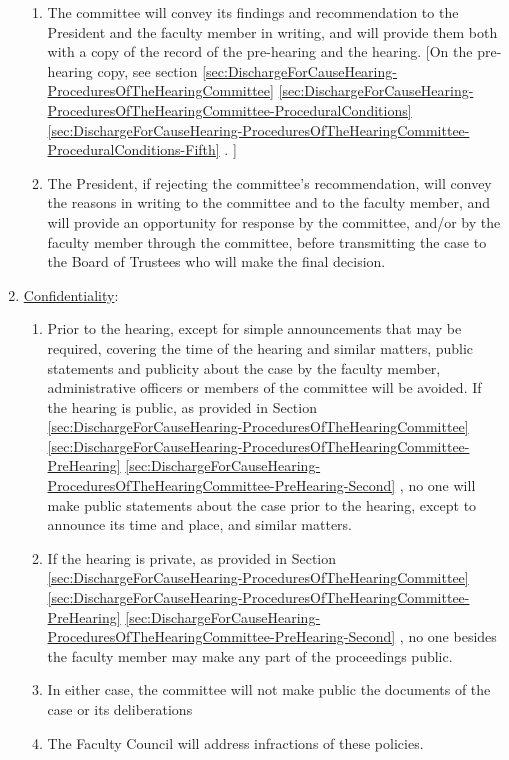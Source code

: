 \begin{enumerate}[label=\alph*)]
{\begin{enumerate}[label=\arabic*)]
{									\ref{sec:NonPerformanceOfContract}
									\ref{par:NonPerformanceOfContract-Sanctions}
									).  If the committee concludes that adequate cause for dismissal has not been established, it will recommend retention of the faculty member either with no penalties or with an academic penalty less than dismissal.}
								\item{
									\label{sec:DischargeForCauseHearing-ProceduresOfTheHearingCommittee-Hearing-Eighth}
									The committee will convey its findings and recommendation to the President and the faculty member in writing, and will provide them both with a copy of the record of the pre-hearing and the hearing.  [On the pre-hearing copy,
											see section
											\ref{sec:DischargeForCauseHearing-ProceduresOfTheHearingCommittee}
											\ref{sec:DischargeForCauseHearing-ProceduresOfTheHearingCommittee-ProceduralConditions}
											\ref{sec:DischargeForCauseHearing-ProceduresOfTheHearingCommittee-ProceduralConditions-Fifth}
											.
										]}
								\item{The President, if rejecting the committee's recommendation, will convey the reasons in writing to the committee and to the faculty member, and will provide an opportunity for response by the committee, and/or by the faculty member through the committee, before transmitting the case to the Board of Trustees who will make the final decision.}
							\end{enumerate}
						}
						\item{\underline{Confidentiality}:
							\begin{enumerate}[label=\arabic*)]
								\item{Prior to the hearing, except for simple announcements that may be required, covering the time of the hearing and similar matters, public statements and publicity about the case by the faculty member, administrative officers or members of the committee will be avoided.  If the hearing is public, as provided in
									Section
									\ref{sec:DischargeForCauseHearing-ProceduresOfTheHearingCommittee}
									\ref{sec:DischargeForCauseHearing-ProceduresOfTheHearingCommittee-PreHearing}
									\ref{sec:DischargeForCauseHearing-ProceduresOfTheHearingCommittee-PreHearing-Second}
									, no one will make public statements about the case prior to the hearing, except to announce its time and place, and similar matters.}
								\item{If the hearing is private, as provided in
									Section
									\ref{sec:DischargeForCauseHearing-ProceduresOfTheHearingCommittee}
									\ref{sec:DischargeForCauseHearing-ProceduresOfTheHearingCommittee-PreHearing}
									\ref{sec:DischargeForCauseHearing-ProceduresOfTheHearingCommittee-PreHearing-Second}
									, no one besides the faculty member may make any part of the proceedings public.}
								\item{In either case, the committee will not make public the documents of the case or its deliberations}
								\item{The Faculty Council will address infractions of these policies.}
							\end{enumerate}
						}
					\end{enumerate}

